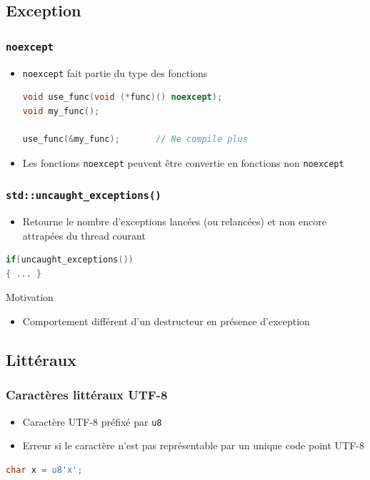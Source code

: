 \documentclass[C++.tex]{subfiles}
\begin{document}
\subsection*{Exception}
\begin{frame}[fragile]
	\frametitle{\lstinline|noexcept|}
	\begin{itemize}
		\item \lstinline|noexcept| fait partie du type des fonctions

		\begin{lstlisting}[language=C++]
void use_func(void (*func)() noexcept);
void my_func();

use_func(&my_func);       // Ne compile plus\end{lstlisting}


		\item Les fonctions \lstinline|noexcept| peuvent être convertie en fonctions non \lstinline|noexcept|
	\end{itemize}	
\end{frame}

\begin{frame}[fragile]
	\frametitle{\lstinline|std::uncaught_exceptions()|}
	\begin{itemize}
		\item Retourne le nombre d'exceptions lancées (ou relancées) et non encore attrapées du thread courant
	\end{itemize}

	\begin{lstlisting}[language=C++]
if(uncaught_exceptions())
{ ... }\end{lstlisting}

	\begin{block}{Motivation}
		\begin{itemize}
			\item Comportement différent d'un destructeur en présence d'exception

		\end{itemize}
	\end{block}
\end{frame}

\subsection*{Littéraux}
\begin{frame}[fragile]
	\frametitle{Caractères littéraux UTF-8}
	\begin{itemize}
		\item Caractère UTF-8 préfixé par \lstinline|u8|
		\item Erreur si le caractère n'est pas représentable par un unique code point UTF-8
	\end{itemize}

	\begin{lstlisting}[language=C++]
char x = u8'x';\end{lstlisting}

\end{frame}
\end{document}
